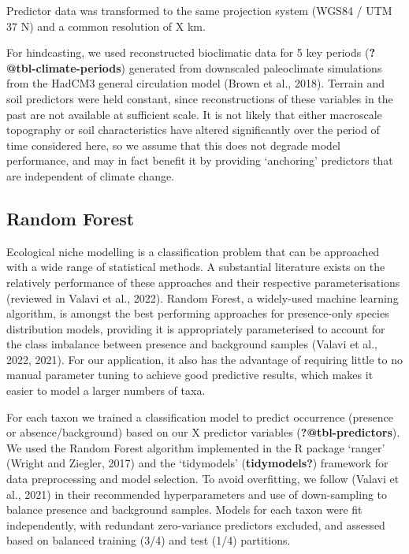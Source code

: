 \documentclass[
  number,
  review]{elsarticle}
\begin{document}
Predictor data was transformed to the same projection system (WGS84 /
UTM 37 N) and a common resolution of X km.

For hindcasting, we used reconstructed bioclimatic data for 5 key
periods (\textbf{?@tbl-climate-periods}) generated from downscaled
paleoclimate simulations from the HadCM3 general circulation model
(Brown et al., 2018). Terrain and soil predictors were held constant,
since reconstructions of these variables in the past are not available
at sufficient scale. It is not likely that either macroscale topography
or soil characteristics have altered significantly over the period of
time considered here, so we assume that this does not degrade model
performance, and may in fact benefit it by providing `anchoring'
predictors that are independent of climate change.

\subsection{Random Forest}\label{random-forest}

Ecological niche modelling is a classification problem that can be
approached with a wide range of statistical methods. A substantial
literature exists on the relatively performance of these approaches and
their respective parameterisations (reviewed in Valavi et al., 2022).
Random Forest, a widely-used machine learning algorithm, is amongst the
best performing approaches for presence-only species distribution
models, providing it is appropriately parameterised to account for the
class imbalance between presence and background samples (Valavi et al.,
2022, 2021). For our application, it also has the advantage of requiring
little to no manual parameter tuning to achieve good predictive results,
which makes it easier to model a larger numbers of taxa.

For each taxon we trained a classification model to predict occurrence
(presence or absence/background) based on our X predictor variables
(\textbf{?@tbl-predictors}). We used the Random Forest algorithm
implemented in the R package `ranger' (Wright and Ziegler, 2017) and the
`tidymodels' (\textbf{tidymodels?}) framework for data preprocessing and
model selection. To avoid overfitting, we follow (Valavi et al., 2021)
in their recommended hyperparameters and use of down-sampling to balance
presence and background samples. Models for each taxon were fit
independently, with redundant zero-variance predictors excluded, and
assessed based on balanced training (3/4) and test (1/4) partitions.
\end{document}
